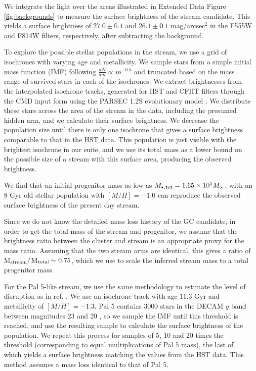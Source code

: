 \documentclass[pdflatex,sn-mathphys-num]{sn-jnl}
\theoremstyle{thmstyleone}
\theoremstyle{thmstyletwo}
\theoremstyle{thmstylethree}
\begin{document}
We integrate the light over the areas illustrated in Extended Data Figure \ref{fig:backgrounds} to measure the surface brightness of the stream candidate. This yields a surface brightness of $27.0\pm0.1$ and $26.1\pm0.1$ mag/arcsec$^2$  in the F555W and F814W filters, respectively, after subtracting the background.

To explore the possible stellar populations in the stream, we use a grid of isochrones with varying age and metallicity. We sample stars from a simple initial mass function (IMF) following $\frac{dN}{dm}\propto m^{-0.5}$ \citep{Grillmair2001} and truncated based on the mass range of survived stars in each of the isochrones. We extract brightnesses from the interpolated isochrone tracks, generated for HST and CFHT filters through the CMD input form \citep{cmdinput} using the PARSEC 1.2S evolutionary model \citep{Chen2015}. We distribute these stars across the area of the stream in the data, including the presumed hidden arm, and we calculate their surface brightness.
We decrease the population size until there is only one isochrone that gives a surface brightness comparable to that in the HST data. This population is just visible with the brightest isochrone in our suite, and we use its total mass as a lower bound on the possible size of a stream with this surface area, producing the observed brightness.

We find that an initial progenitor mass as low as $ M_{\star, \rm tot} = 1.65 \times 10^5 M_\odot$, with an 8 Gyr old stellar population with $[M/H]=-1.0$ can reproduce the observed surface brightness of the present day stream.

Since we do not know the detailed mass loss history of the GC candidate, in order to get the total mass of the stream and progenitor, we assume that the brightness ratio between the cluster and stream is an appropriate proxy for the mass ratio. Assuming that the two stream arms are identical, this gives a ratio of M$_{\rm stream}/$M$_{\rm total} \sim 0.75$, which we use to scale the inferred stream mass to a total progenitor mass.

For the Pal 5-like stream, we use the same methodology to estimate the level of disruption as in ref. \citep{Pearson2019}. We use an isochrone track with age $11.3$ Gyr and metallicity of $ [M/H]= -1.3$. Pal 5 contains 3000 stars in the DECAM $g$ band between magnitudes 23 and 20 \citep{Bonaca2020}, so we sample the IMF until this threshold is reached, and use the resulting sample to calculate the surface brightness of the population. We repeat this process for samples of 5, 10 and 20 times the threshold (corresponding to equal multiplications of Pal 5 mass), the last of which yields a surface brightness matching the values from the HST data. This method assumes a mass loss identical to that of Pal 5.
\end{document}
